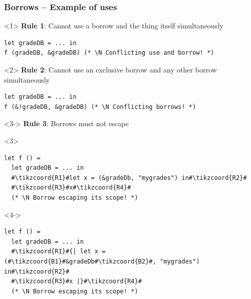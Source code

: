 \documentclass[aspectratio=169,dvipsnames,svgnames,10pt]{beamer}
\newcommand\Y{{\color{Green}{\ding{52}}}}
\newcommand\N{{\color{Red}{\ding{56}}}}
\begin{document}
\begin{frame}[fragile]
  \frametitle{Borrows -- Example of uses}

\begin{onlyenv}<1>
  \textbf{Rule 1}: Cannot use a borrow and the thing itself simultaneously
\begin{verbatim}
let gradeDB = ... in
f (gradeDB, &gradeDB) (* \N Conflicting use and borrow! *)
\end{verbatim}
\end{onlyenv}%
\begin{onlyenv}<2>
  \textbf{Rule 2}: Cannot use an exclusive borrow and any other borrow simultaneously
\begin{verbatim}
let gradeDB = ... in
f (&!gradeDB, &gradeDB) (* \N Conflicting borrows! *)
\end{verbatim}
\end{onlyenv}%
\begin{onlyenv}<3->
  \textbf{Rule 3}: Borrows must not escape
  \begin{onlyenv}<3>
\begin{verbatim}
let f () = 
  let gradeDB = ... in
  #\tikzcoord{R1}#let x = (&gradeDb, "mygrades") in#\tikzcoord{R2}#
  #\tikzcoord{R3}#x#\tikzcoord{R4}#
  (* \N Borrow escaping its scope! *)
\end{verbatim}
  \end{onlyenv}
  \begin{onlyenv}<4->
\begin{verbatim}
let f () = 
  let gradeDB = ... in
  #\tikzcoord{R1}#{| let x = (#\tikzcoord{B1}#&gradeDb#\tikzcoord{B2}#, "mygrades") in#\tikzcoord{R2}#
  #\tikzcoord{R3}#x |}#\tikzcoord{R4}#
  (* \N Borrow escaping its scope! *)
\end{verbatim}
  \end{onlyenv}%
\end{onlyenv}
\end{frame}
\end{document}
